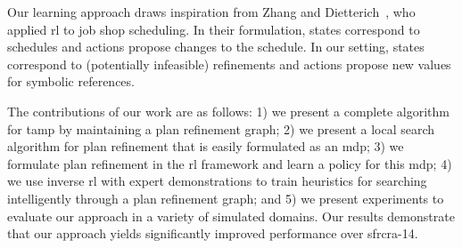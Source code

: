 Our learning approach draws inspiration
from Zhang and Dietterich~\cite{JobShopSched}, who applied {\sc rl} to job
shop scheduling. In their formulation, states correspond to schedules
and actions propose changes to the schedule. In our setting, states
correspond to (potentially infeasible) refinements and actions propose
new values for symbolic references.

The contributions of our work are as follows: 1) we present a complete
algorithm for {\sc tamp} by maintaining a plan refinement graph; 2) we
present a local search algorithm for plan refinement that is easily
formulated as an {\sc mdp}; 3) we formulate plan refinement in the {\sc rl}
framework and learn a policy for this {\sc mdp}; 4) we use inverse {\sc rl} with
expert demonstrations to train heuristics for
searching intelligently through a plan refinement graph; and 5) we
present experiments to evaluate our approach in a variety of simulated
domains. Our results demonstrate that our approach yields
significantly improved performance over {\sc sfrcra-14}.
